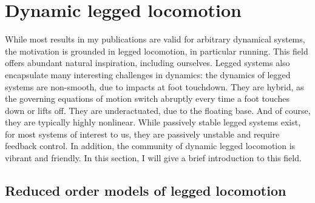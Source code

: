 \section{Dynamic legged locomotion}
While most results in my publications are valid for arbitrary dynamical systems, the motivation is grounded in legged locomotion, in particular running. This field offers abundant natural inspiration, including ourselves. Legged systems also encapsulate many interesting challenges in dynamics: the dynamics of legged systems are non-smooth, due to impacts at foot touchdown. They are hybrid, as the governing equations of motion switch abruptly every time a foot touches down or lifts off. They are underactuated, due to the floating base. And of course, they are typically highly nonlinear. While passively stable legged systems exist, for most systems of interest to us, they are passively unstable and require feedback control.
In addition, the community of dynamic legged locomotion is vibrant and friendly. In this section, I will give a brief introduction to this field.

\subsection{Reduced order models of legged locomotion}

